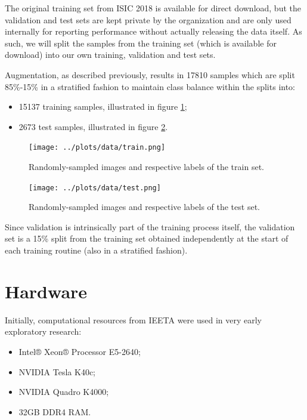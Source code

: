 The original training set from \ac{ISIC} 2018 is available for direct download, but the validation and test sets are kept private by the organization and are only used internally for reporting performance without actually releasing the data itself. As such, we will split the samples from the training set (which is available for download) into our own training, validation and test sets.

Augmentation, as described previously, results in 17810 samples which are split 85\%-15\% in a stratified fashion to maintain class balance within the splits into:

\begin{itemize}
    \item 15137 training samples, illustrated in figure \ref{fig:data_train};
    \item 2673 test samples, illustrated in figure \ref{fig:data_test}.
\end{itemize}

\begin{figure}[ht]
    \centering
    \texttt{[image: ../plots/data/train.png]}
    \caption{Randomly-sampled images and respective labels of the train set.}
    \label{fig:data_train}
\end{figure}

\begin{figure}[ht]
    \centering
    \texttt{[image: ../plots/data/test.png]}
    \caption{Randomly-sampled images and respective labels of the test set.}
    \label{fig:data_test}
\end{figure}

Since validation is intrinsically part of the training process itself, the validation set is a 15\% split from the training set obtained independently at the start of each training routine (also in a stratified fashion).

\section{Hardware}

Initially, computational resources from \ac{IEETA} were used in very early exploratory research:

\begin{itemize}
    \item Intel® Xeon® Processor E5-2640;
    \item NVIDIA Tesla K40c;
    \item NVIDIA Quadro K4000;
    \item 32GB DDR4 RAM.
\end{itemize}

